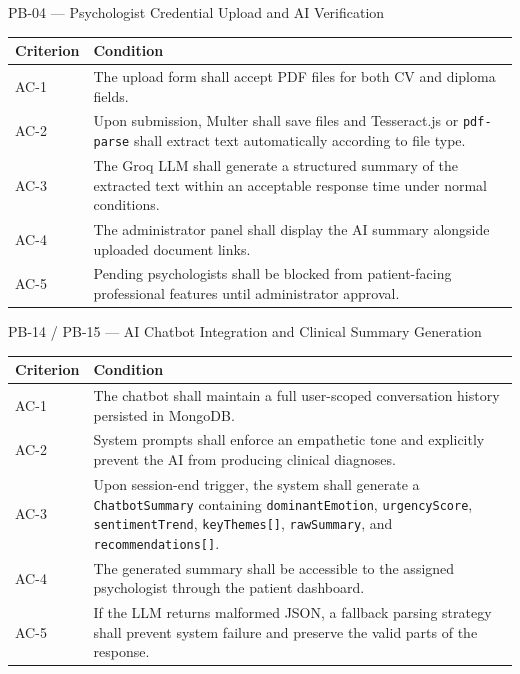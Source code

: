 \documentclass[a4paper,12pt]{report}
\begin{document}
\noindent
\begin{mdframed}[backgroundcolor=lightgray, linecolor=primaryblue, linewidth=1.2pt,
                 innertopmargin=8pt, innerbottommargin=8pt, innerleftmargin=10pt]
PB-04 --- Psychologist Credential Upload and AI Verification
\end{mdframed}

\begin{longtable}{@{} L{2cm} L{12.3cm} @{}}
\toprule
{}
\bfseries Criterion & \bfseries Condition \\
\midrule
AC-1 & The upload form shall accept PDF files for both CV and diploma fields. \\
\midrule
AC-2 & Upon submission, Multer shall save files and Tesseract.js or \texttt{pdf-parse} shall extract text automatically according to file type. \\
\midrule
AC-3 & The Groq LLM shall generate a structured summary of the extracted text within an acceptable response time under normal conditions. \\
\midrule
AC-4 & The administrator panel shall display the AI summary alongside uploaded document links. \\
\midrule
AC-5 & Pending psychologists shall be blocked from patient-facing professional features until administrator approval. \\
\bottomrule
\end{longtable}
\clearpage
\noindent
\begin{mdframed}[backgroundcolor=lightgray, linecolor=primaryblue, linewidth=1.2pt,
                 innertopmargin=8pt, innerbottommargin=8pt, innerleftmargin=10pt]
PB-14 / PB-15 --- AI Chatbot Integration and Clinical Summary Generation
\end{mdframed}

\begin{longtable}{@{} L{2cm} L{12.3cm} @{}}
\toprule
{}
\bfseries Criterion & \bfseries Condition \\
\midrule
AC-1 & The chatbot shall maintain a full user-scoped conversation history persisted in MongoDB. \\
\midrule
AC-2 & System prompts shall enforce an empathetic tone and explicitly prevent the AI from producing clinical diagnoses. \\
\midrule
AC-3 & Upon session-end trigger, the system shall generate a \texttt{ChatbotSummary} containing \texttt{dominantEmotion}, \texttt{urgencyScore}, \texttt{sentimentTrend}, \texttt{keyThemes[]}, \texttt{rawSummary}, and \texttt{recommendations[]}. \\
\midrule
AC-4 & The generated summary shall be accessible to the assigned psychologist through the patient dashboard. \\
\midrule
AC-5 & If the LLM returns malformed JSON, a fallback parsing strategy shall prevent system failure and preserve the valid parts of the response. \\
\bottomrule
\end{longtable}
\end{document}
